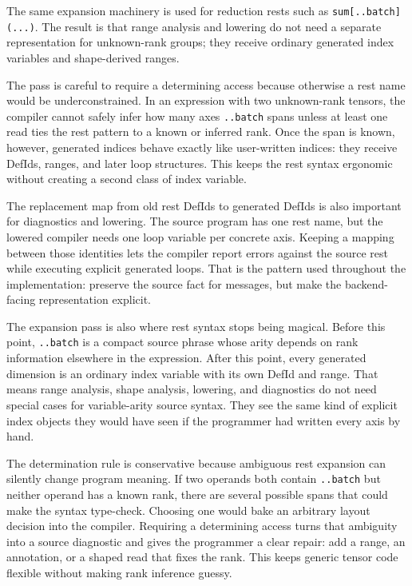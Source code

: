 The same expansion machinery is used for reduction rests such as
\texttt{sum[..batch](...)}. The result is that range analysis and lowering do
not need a separate representation for unknown-rank groups; they receive
ordinary generated index variables and shape-derived ranges.

The pass is careful to require a determining access because otherwise a rest
name would be underconstrained. In an expression with two unknown-rank tensors,
the compiler cannot safely infer how many axes \texttt{..batch} spans unless at
least one read ties the rest pattern to a known or inferred rank. Once the span
is known, however, generated indices behave exactly like user-written indices:
they receive DefIds, ranges, and later loop structures. This keeps the rest
syntax ergonomic without creating a second class of index variable.

The replacement map from old rest DefIds to generated DefIds is also important
for diagnostics and lowering. The source program has one rest name, but the
lowered compiler needs one loop variable per concrete axis. Keeping a mapping
between those identities lets the compiler report errors against the source
rest while executing explicit generated loops. That is the pattern used
throughout the implementation: preserve the source fact for messages, but make
the backend-facing representation explicit.

The expansion pass is also where rest syntax stops being magical. Before this
point, \texttt{..batch} is a compact source phrase whose arity depends on rank
information elsewhere in the expression. After this point, every generated
dimension is an ordinary index variable with its own DefId and range. That means
range analysis, shape analysis, lowering, and diagnostics do not need special
cases for variable-arity source syntax. They see the same kind of explicit
index objects they would have seen if the programmer had written every axis by
hand.

The determination rule is conservative because ambiguous rest expansion can
silently change program meaning. If two operands both contain \texttt{..batch}
but neither operand has a known rank, there are several possible spans that
could make the syntax type-check. Choosing one would bake an arbitrary layout
decision into the compiler. Requiring a determining access turns that ambiguity
into a source diagnostic and gives the programmer a clear repair: add a range,
an annotation, or a shaped read that fixes the rank. This keeps generic tensor
code flexible without making rank inference guessy.

